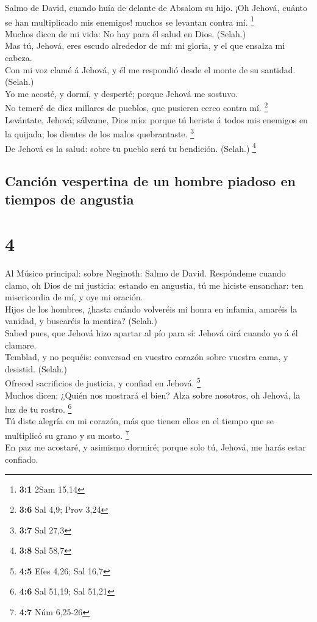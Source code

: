  Salmo de David, cuando huía de delante de Absalom su hijo.
¡Oh Jehová, cuánto se han multiplicado mis enemigos! muchos se levantan
contra mí. \footnote{\textbf{3:1} 2Sam 15,14}\\
 Muchos dicen de mi vida: No hay para él salud en Dios.
(Selah.)\\
 Mas tú, Jehová, eres escudo alrededor de mí: mi gloria, y
el que ensalza mi cabeza.\\
 Con mi voz clamé á Jehová, y él me respondió desde el monte
de su santidad. (Selah.)\\
 Yo me acosté, y dormí, y desperté; porque Jehová me
sostuvo.\\
 No temeré de diez millares de pueblos, que pusieren cerco
contra mí. \footnote{\textbf{3:6} Sal 4,9; Prov 3,24}\\
 Levántate, Jehová; sálvame, Dios mío: porque tú heriste á
todos mis enemigos en la quijada; los dientes de los malos quebrantaste.
\footnote{\textbf{3:7} Sal 27,3}\\
 De Jehová es la salud: sobre tu pueblo será tu bendición.
(Selah.) \footnote{\textbf{3:8} Sal 58,7}

\hypertarget{canciuxf3n-vespertina-de-un-hombre-piadoso-en-tiempos-de-angustia}{%
\subsection{Canción vespertina de un hombre piadoso en tiempos de
angustia}\label{canciuxf3n-vespertina-de-un-hombre-piadoso-en-tiempos-de-angustia}}

\hypertarget{section-3}{%
\section{4}\label{section-3}}

 Al Músico principal: sobre Neginoth: Salmo de David.
Respóndeme cuando clamo, oh Dios de mi justicia: estando en angustia, tú
me hiciste ensanchar: ten misericordia de mí, y oye mi oración.\\
 Hijos de los hombres, ¿hasta cuándo volveréis mi honra en
infamia, amaréis la vanidad, y buscaréis la mentira? (Selah.)\\
 Sabed pues, que Jehová hizo apartar al pío para sí: Jehová
oirá cuando yo á él clamare.\\
 Temblad, y no pequéis: conversad en vuestro corazón sobre
vuestra cama, y desistid. (Selah.)\\
 Ofreced sacrificios de justicia, y confiad en Jehová.
\footnote{\textbf{4:5} Efes 4,26; Sal 16,7}\\
 Muchos dicen: ¿Quién nos mostrará el bien? Alza sobre
nosotros, oh Jehová, la luz de tu rostro. \footnote{\textbf{4:6} Sal
  51,19; Sal 51,21}\\
 Tú diste alegría en mi corazón, más que tienen ellos en el
tiempo que se multiplicó su grano y su mosto. \footnote{\textbf{4:7} Núm
  6,25-26}\\
 En paz me acostaré, y asimismo dormiré; porque solo tú,
Jehová, me harás estar confiado.

